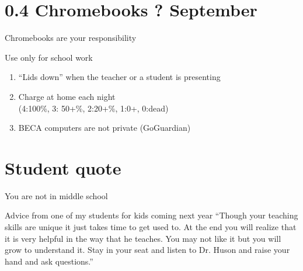 \section{0.4 Chromebooks \hfill ? September}
\begin{frame}{Chromebooks are your responsibility}
  \begin{block}{Use only for school work}
    \begin{enumerate}
      \item ``Lids down'' when the teacher or a student is presenting
      \item Charge at home each night\\
        (4:100\%, 3: 50+\%, 2:20+\%, 1:0+, 0:dead)
      \item BECA computers are not private (GoGuardian)
    \end{enumerate}
    \end{block}
  \end{frame}

\section{Student quote}
\begin{frame}{You are not in middle school}
  \begin{block}{Advice from one of my students for kids coming next year}\vspace{0.5cm}
    ``Though your teaching skills are unique it just takes time to get used to. At the end you will realize that it is very helpful in the way that he teaches. You may not like it but you will grow to understand it. Stay in your seat and listen to Dr. Huson and raise your hand and ask questions.''
  \end{block}
  \end{frame}

